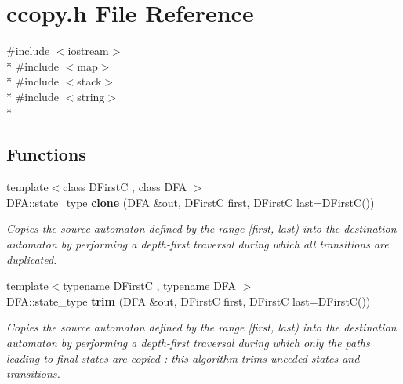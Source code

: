 \section{ccopy.\+h File Reference}
\label{ccopy_8h}
{\ttfamily \#include $<$iostream$>$}\\*
{\ttfamily \#include $<$map$>$}\\*
{\ttfamily \#include $<$stack$>$}\\*
{\ttfamily \#include $<$string$>$}\\*
\subsection*{Functions}
\begin{DoxyCompactItemize}
\item 
{\footnotesize template$<$class D\+First\+C , class D\+F\+A $>$ }\\D\+F\+A\+::state\+\_\+type {\bfseries clone} (D\+F\+A \&out, D\+First\+C first, D\+First\+C last=D\+First\+C())
\begin{DoxyCompactList}\small\item\em Copies the source automaton defined by the range {\ttfamily  [first, last) } into the destination automaton by performing a depth-\/first traversal during which all transitions are duplicated. \end{DoxyCompactList}\item 
{\footnotesize template$<$typename D\+First\+C , typename D\+F\+A $>$ }\\D\+F\+A\+::state\+\_\+type {\bfseries trim} (D\+F\+A \&out, D\+First\+C first, D\+First\+C last=D\+First\+C())
\begin{DoxyCompactList}\small\item\em Copies the source automaton defined by the range {\ttfamily  [first, last) } into the destination automaton by performing a depth-\/first traversal during which only the paths leading to final states are copied \+: this algorithm trims uneeded states and transitions. \end{DoxyCompactList}\end{DoxyCompactItemize}
